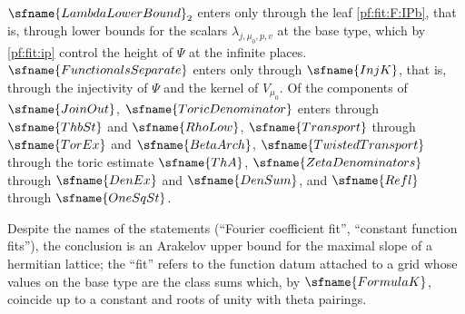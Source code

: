 \begin{remark}\label{pf:fit:rem:where}
$\sfname{LambdaLowerBound}_2$ enters only through the leaf \ref{pf:fit:F:IPb}, that is, through lower bounds for the scalars
$\lambda_{j,\mu_0,p,v}$ at the base type, which by \cref{pf:fit:ip} control the height of $\Psi$ at the infinite places.
$\sfname{FunctionalsSeparate}$ enters only through $\sfname{InjK}$, that is, through the injectivity of $\Psi$ and the kernel
of $V_{\mu_0}$. Of the components of $\sfname{JoinOut}$, $\sfname{ToricDenominator}$ enters through $\sfname{ThbSt}$ and
$\sfname{RhoLow}$, $\sfname{Transport}$ through $\sfname{TorEx}$ and $\sfname{BetaArch}$, $\sfname{TwistedTransport}$ through
the toric estimate $\sfname{ThA}$, $\sfname{ZetaDenominators}$ through $\sfname{DenEx}$ and $\sfname{DenSum}$, and
$\sfname{Refl}$ through $\sfname{OneSqSt}$.
\end{remark}

\begin{remark}[Name]\label{pf:fit:rem:name}
Despite the names of the statements (``Fourier coefficient fit'', ``constant function fits''), the conclusion is an Arakelov
upper bound for the maximal slope of a hermitian lattice; the ``fit'' refers to the function datum attached to a grid whose
values on the base type are the class sums which, by $\sfname{FormulaK}$, coincide up to a constant and roots of unity with
theta pairings.
\end{remark}

